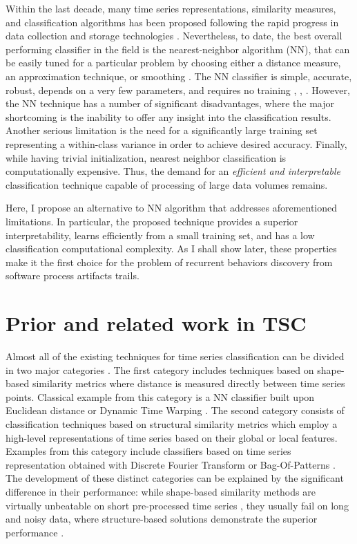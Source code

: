 Within the last decade, many time series representations, similarity measures, and classification algorithms 
has been proposed following the rapid progress in data collection and storage technologies \cite{citeulike:10358271}. 
Nevertheless, to date, the best overall performing classifier in the field is the nearest-neighbor algorithm (NN), 
that can be easily tuned for a particular problem by choosing either a distance measure, an approximation technique, 
or smoothing \cite{citeulike:10358271}.
The NN classifier is simple, accurate, robust, depends on a very few parameters, and requires no training 
\cite{citeulike:10358271}, \cite{citeulike:532340}, \cite{citeulike:12563424}.
However, the NN technique has a number of significant disadvantages, where the major shortcoming is the 
inability to offer any insight into the classification results. 
Another serious limitation is the need for a significantly large training set representing a within-class 
variance in order to achieve desired accuracy. 
Finally, while having trivial initialization, nearest neighbor classification is computationally expensive. 
Thus, the demand for an \textit{efficient and interpretable} classification technique capable of processing of 
large data volumes remains.

Here, I propose an alternative to NN algorithm that addresses aforementioned limitations. 
In particular, the proposed technique provides a superior interpretability, learns efficiently from a small 
training set, and has a low classification computational complexity. 
As I shall show later, these properties make it the first choice for the problem of recurrent behaviors 
discovery from software process artifacts trails.

\section{Prior and related work in TSC} \label{sax_vsm_prior}
Almost all of the existing techniques for time series classification can be divided in two major categories \cite{citeulike:11796594}. 
The first category includes techniques based on shape-based similarity metrics where distance is measured directly between time 
series points. Classical example from this category is a NN classifier built upon Euclidean distance \cite{citeulike:4214336} or 
Dynamic Time Warping \cite{senin2008dynamic}. 
The second category consists of classification techniques based on structural similarity metrics which employ a high-level 
representations of time series based on their global or local features. 
Examples from this category include classifiers based on time series representation obtained with 
Discrete Fourier Transform \cite{citeulike:5094223} or Bag-Of-Patterns \cite{citeulike:10525778}. 
The development of these distinct categories can be explained by the significant difference in their performance: 
while shape-based similarity methods are virtually unbeatable on short pre-processed time series \cite{citeulike:532340}, 
they usually fail on long and noisy data, where structure-based solutions demonstrate the superior performance \cite{citeulike:10525778}. 

